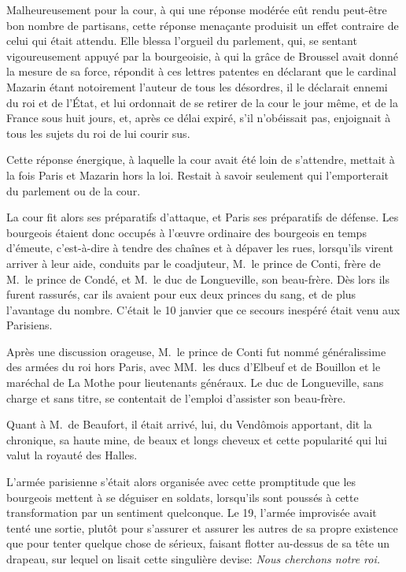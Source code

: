 Malheureusement pour la cour, à qui une réponse modérée eût rendu peut-être bon nombre de partisans, cette réponse menaçante produisit un effet contraire de celui qui était attendu. Elle blessa l'orgueil du parlement, qui, se sentant vigoureusement appuyé par la bourgeoisie, à qui la grâce de Broussel avait donné la mesure de sa force, répondit à ces lettres patentes en déclarant que le cardinal Mazarin étant notoirement l'auteur de tous les désordres, il le déclarait ennemi du roi et de l'État, et lui ordonnait de se retirer de la cour le jour même, et de la France sous huit jours, et, après ce délai expiré, s'il n'obéissait pas, enjoignait à tous les sujets du roi de lui courir sus.

Cette réponse énergique, à laquelle la cour avait été loin de s'attendre, mettait à la fois Paris et Mazarin hors la loi. Restait à savoir seulement qui l'emporterait du parlement ou de la cour.

La cour fit alors ses préparatifs d'attaque, et Paris ses préparatifs de défense. Les bourgeois étaient donc occupés à l'œuvre ordinaire des bourgeois en temps d'émeute, c'est-à-dire à tendre des chaînes et à dépaver les rues, lorsqu'ils virent arriver à leur aide, conduits par le coadjuteur, M.~le prince de Conti, frère de M.~le prince de Condé, et M.~le duc de Longueville, son beau-frère. Dès lors ils furent rassurés, car ils avaient pour eux deux princes du sang, et de plus l'avantage du nombre. C'était le 10 janvier que ce secours inespéré était venu aux Parisiens.

Après une discussion orageuse, M.~le prince de Conti fut nommé généralissime des armées du roi hors Paris, avec MM.~les ducs d'Elbeuf et de Bouillon et le maréchal de La Mothe pour lieutenants généraux. Le duc de Longueville, sans charge et sans titre, se contentait de l'emploi d'assister son beau-frère.

Quant à M.~de Beaufort, il était arrivé, lui, du Vendômois apportant, dit la chronique, sa haute mine, de beaux et longs cheveux et cette popularité qui lui valut la royauté des Halles.

L'armée parisienne s'était alors organisée avec cette promptitude que les bourgeois mettent à se déguiser en soldats, lorsqu'ils sont poussés à cette transformation par un sentiment quelconque. Le 19, l'armée improvisée avait tenté une sortie, plutôt pour s'assurer et assurer les autres de sa propre existence que pour tenter quelque chose de sérieux, faisant flotter au-dessus de sa tête un drapeau, sur lequel on lisait cette singulière devise: \textit{Nous cherchons notre roi.}

